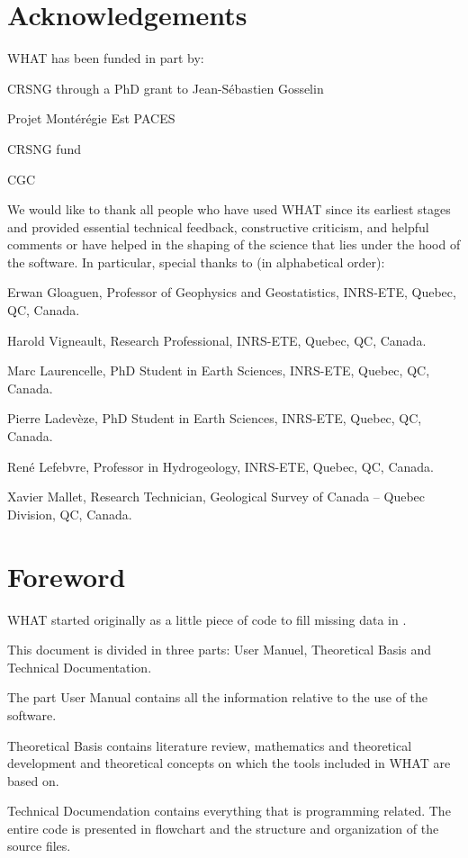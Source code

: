 \documentclass[WHATMANUAL.tex]{subfiles}
\begin{document}
\chapter*{Acknowledgements}

WHAT has been funded in part by:

\begin{description}
\item CRSNG through a PhD grant to Jean-S\'ebastien Gosselin
\item Projet Montérégie Est PACES
\item CRSNG fund
\item CGC
\end{description}

We would like to thank all people who have used WHAT since its earliest stages and provided essential technical feedback, constructive criticism, and helpful comments or have helped in the shaping of the science that lies under the hood of the software. In particular, special thanks to (in alphabetical order):

\begin{description}
\item Erwan Gloaguen, Professor of Geophysics and Geostatistics, INRS-ETE, Quebec, QC, Canada.
\item Harold Vigneault, Research Professional, INRS-ETE, Quebec, QC, Canada.
\item Marc Laurencelle, PhD Student in Earth Sciences, INRS-ETE, Quebec, QC, Canada.
\item Pierre Ladev\`eze, PhD Student in Earth Sciences, INRS-ETE, Quebec, QC, Canada.
\item Ren\'e Lefebvre, Professor in Hydrogeology, INRS-ETE, Quebec, QC, Canada.
\item Xavier Mallet, Research Technician, Geological Survey of Canada – Quebec Division, QC, Canada.
\end{description}

\chapter*{Foreword}


WHAT started originally as a little piece of code to fill missing data in .

This document is divided in three parts: User Manuel, Theoretical Basis and Technical Documentation.

The part User Manual contains all the information relative to the use of the software.

Theoretical Basis contains literature review, mathematics and theoretical development and theoretical concepts on which the tools included in WHAT are based on.

Technical Documendation contains everything that is programming related. The entire code is presented in flowchart and the structure and organization of the source files.
\end{document}

